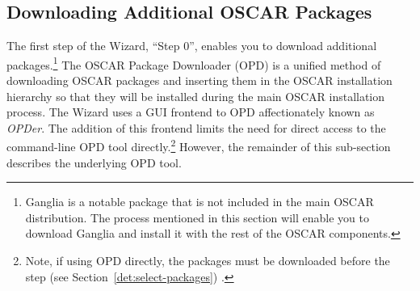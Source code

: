 
\subsection{Downloading Additional OSCAR Packages}
\label{det:opd}

\optional

The first step of the Wizard, ``Step 0'', enables you to download
additional packages.\footnote{Ganglia is a notable
  package that is not included in the main OSCAR distribution.  The
  process mentioned in this section will enable you to download
  Ganglia and install it with the rest of the OSCAR components.}  
The OSCAR Package Downloader (OPD) is a unified method of downloading
OSCAR packages and inserting them in the OSCAR installation hierarchy
so that they will be installed during the main OSCAR installation
process.  The Wizard uses a GUI frontend to OPD affectionately known as
\emph{OPDer}.  The addition of this frontend limits the need for direct
access to the command-line OPD tool directly.\footnote{Note, if using OPD
directly, the packages must be downloaded before the  step (see Section~\ref{det:select-packages}) .}  However, 
the remainder of this sub-section describes the underlying OPD tool.


